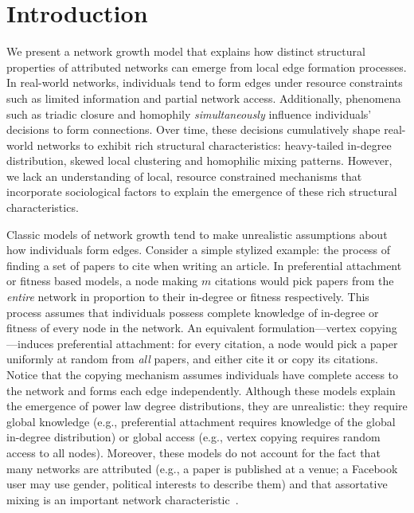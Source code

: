 \section{Introduction}
\label{sec:Introduction}



We present a network growth model that explains how distinct
structural properties of attributed networks can emerge from local edge
formation processes. In real-world networks, individuals tend to form edges
under resource constraints such as limited information and partial network access.
Additionally, phenomena such as triadic closure and homophily
\textit{simultaneously} influence individuals' decisions to form connections.
Over time, these decisions cumulatively shape real-world networks to exhibit
rich structural characteristics: heavy-tailed in-degree distribution, skewed
local clustering and homophilic mixing patterns. However, we lack an
understanding of local, resource constrained mechanisms that incorporate
sociological factors to explain the emergence of these rich structural
characteristics.




Classic models of network growth tend to make unrealistic assumptions about how
individuals form edges. Consider a simple stylized example: the process of
finding a set of papers to cite when writing an article. In preferential
attachment \cite{barabasi1999emergence} or fitness
\cite{bianconi2001bose,caldarelli2002scale,wang2013quantifying} based models, a
node making $m$ citations would pick papers from the \textit{entire} network in
proportion to their in-degree or fitness respectively. This process assumes that
individuals possess {complete} knowledge of in-degree or fitness of every node
in the network. An equivalent formulation---vertex copying
\cite{kumar2000stochastic}---induces preferential attachment: for every
citation, a node would pick a paper uniformly at random from \textit{all}
papers, and either cite it or copy its citations. Notice that the copying
mechanism assumes individuals have complete access to the network and forms each
edge independently. Although these models explain the emergence of power law
degree distributions, they are unrealistic: they require global knowledge (e.g.,
preferential attachment requires knowledge of the global in-degree distribution)
or global access (e.g., vertex copying requires random access to all nodes).
Moreover, these models do not account for the fact that many
networks are attributed (e.g., a paper is published at a venue; a Facebook user
may use gender, political interests to describe them) and that assortative
mixing is an important network characteristic~\cite{newman2002assortative}.

